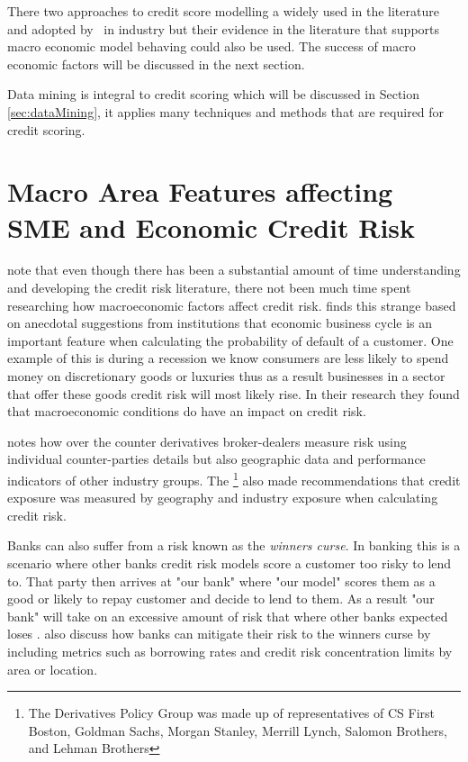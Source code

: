 There two approaches to credit score modelling a widely used in the literature and adopted by \subjectname\ in industry but their evidence in the literature that supports macro economic model behaving could also be used. The success of macro economic factors will be discussed in the next section.

Data mining  is integral to credit scoring which will be discussed in Section \ref{sec:dataMining}, it applies many techniques and methods that are required for credit scoring.

\section{Macro Area Features affecting SME and Economic Credit Risk}
\cite{hackbarth_capital_2006} note that even though there has been a substantial amount of time  understanding and developing the credit risk literature, there not been much time spent researching how macroeconomic factors affect credit risk.  \cite{hackbarth_capital_2006} finds this strange based on anecdotal suggestions from institutions that economic business cycle is an important feature when calculating the probability of default of a customer. One example of this is during a recession we know consumers are less likely to spend money on discretionary goods or luxuries thus as a result businesses in a sector that offer these goods credit risk will most likely rise. In their research they found that macroeconomic conditions do have an impact on credit risk.

\cite{fama_term_1986} notes how over the counter derivatives broker-dealers measure risk using individual counter-parties details but also geographic data and performance indicators of other industry groups. The \cite{derivatives_policy_group_framework_1995} \footnote{The Derivatives Policy Group was made up of representatives of CS First Boston, Goldman Sachs, Morgan Stanley, Merrill Lynch, Salomon Brothers, and Lehman Brothers} also made recommendations that credit exposure was measured by geography and industry exposure when calculating credit risk.

Banks can also suffer from a risk known as the \textit{winners curse}. In banking this is a scenario where other banks credit risk models score a customer too risky to lend to. That party then arrives at "our bank" where "our model" scores them as a good or likely to repay customer and decide to lend to them. As a result "our bank" will take on an excessive amount of risk that where other banks expected loses \citep{duffie_credit_2012}. \cite{duffie_credit_2012} also discuss how banks can mitigate their risk to the winners curse by including metrics such as borrowing rates and credit risk concentration limits by area or location.

